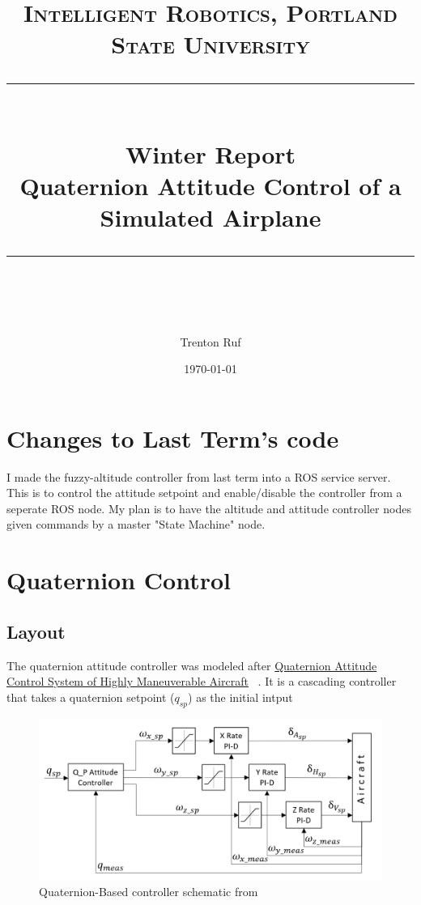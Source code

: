 \documentclass[11pt]{scrartcl} %
\title{	
	\normalfont\normalsize
	\textsc{Intelligent Robotics, Portland State University}\\ %
	\vspace{25pt} %
	\rule{\linewidth}{0.5pt}\\ %
	\vspace{20pt} %
	{\huge Winter Report}\\ %
	\vspace{4pt} %
	{\large Quaternion Attitude Control of a Simulated Airplane}\\ %
	\vspace{12pt} %
	\rule{\linewidth}{2pt}\\ %
	\vspace{12pt} %
}
\author{\LARGE Trenton Ruf} %
\date{\normalsize \today} %
\begin{document}
\maketitle %




\renewcommand\thesubsection{\Roman{subsection}}
\section{Changes to Last Term's code}
I made the fuzzy-altitude controller from last term into a ROS service server. This is to control the attitude setpoint and enable/disable the controller from a seperate ROS node. My plan is to have the altitude and attitude controller nodes given commands by a master "State Machine" node.


\section{Quaternion Control}
\subsection{Layout}
The quaternion attitude controller was modeled after \underline{Quaternion Attitude Control System of Highly Maneuverable Aircraft} ~\cite{quat}.
It is a cascading controller that takes a quaternion setpoint ($q_{sp}$) as the initial intput

\begin{figure}[ht!] %
	\centering
	\includegraphics[width=0.9\columnwidth]{QuatSchematicPID.png} 
	\caption{Quaternion-Based controller schematic from ~\cite{quat}}
\end{figure}
\end{document}
